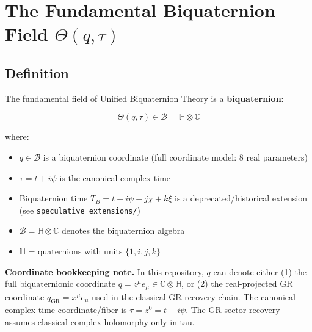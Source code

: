 

\section{The Fundamental Biquaternion Field $\Theta(q,\tau)$}
\label{sec:canonical:theta_field}

\subsection{Definition}

The fundamental field of Unified Biquaternion Theory is a \textbf{biquaternion}:

\begin{equation}
\label{eq:canonical:theta_field}
\boxed{\Theta(q,\tau) \in \mathcal{B} = \mathbb{H} \otimes \mathbb{C}}
\end{equation}

\noindent where:
\begin{itemize}
    \item $q \in \mathcal{B}$ is a biquaternion coordinate (full coordinate model: 8 real parameters)
    \item $\tau = t + i\psi$ is the canonical complex time
    \item Biquaternion time $T_B = t + i\psi + j\chi + k\xi$ is a deprecated/historical extension (see \texttt{speculative\_extensions/})
    \item $\mathcal{B} = \mathbb{H} \otimes \mathbb{C}$ denotes the biquaternion algebra
    \item $\mathbb{H}$ = quaternions with units $\{1, i, j, k\}$
\end{itemize}

\noindent\textbf{Coordinate bookkeeping note.}
In this repository, \(q\) can denote either (1) the full biquaternionic coordinate \(q=z^\mu e_\mu\in\mathbb{C}\otimes\mathbb{H}\), or (2) the real-projected GR coordinate \(q_{\mathrm{GR}}=x^\mu e_\mu\) used in the classical GR recovery chain.
The canonical complex-time coordinate/fiber is \(\tau=z^0=t+i\psi\).
The GR-sector recovery assumes classical complex holomorphy only in tau.

